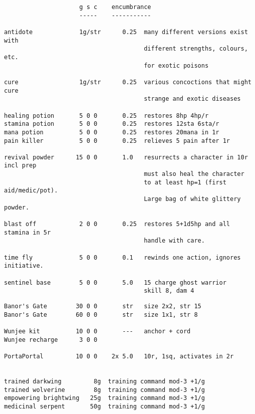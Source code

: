 \small
\begin{verbatim}
                     g s c    encumbrance
                     -----    -----------

antidote             1g/str      0.25  many different versions exist with
                                       different strengths, colours, etc.
                                       for exotic poisons

cure                 1g/str      0.25  various concoctions that might cure
                                       strange and exotic diseases

healing potion       5 0 0       0.25  restores 8hp 4hp/r
stamina potion       5 0 0       0.25  restores 12sta 6sta/r
mana potion          5 0 0       0.25  restores 20mana in 1r
pain killer          5 0 0       0.25  relieves 5 pain after 1r

revival powder      15 0 0       1.0   resurrects a character in 10r incl prep
                                       must also heal the character
                                       to at least hp=1 (first aid/medic/pot).
                                       Large bag of white glittery powder.

blast off            2 0 0       0.25  restores 5+1d5hp and all stamina in 5r
                                       handle with care.

time fly             5 0 0       0.1   rewinds one action, ignores initiative.

sentinel base        5 0 0       5.0   15 charge ghost warrior
                                       skill 8, dam 4

\end{verbatim} \pagebreak[1] \begin{verbatim}
Banor's Gate        30 0 0       str   size 2x2, str 15
Banor's Gate        60 0 0       str   size 1x1, str 8

Wunjee kit          10 0 0       ---   anchor + cord
Wunjee recharge      3 0 0

PortaPortal         10 0 0    2x 5.0   10r, 1sq, activates in 2r


trained darkwing         8g  training command mod-3 +1/g
trained wolverine        8g  training command mod-3 +1/g
empowering brightwing   25g  training command mod-3 +1/g
medicinal serpent       50g  training command mod-3 +1/g

\end{verbatim}
\normalsize

